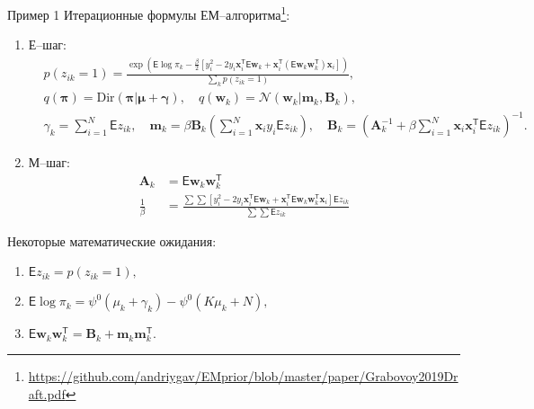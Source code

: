 \documentclass[9pt,pdf,hyperref={unicode}]{beamer}
\begin{document}
\begin{frame}{Пример 1}
\justifying
Итерационные формулы ЕМ--алгоритма\footnote{\url{https://github.com/andriygav/EMprior/blob/master/paper/Grabovoy2019Draft.pdf}}:
	\begin{enumerate}
		\item Е--шаг: 
			\begin{equation}
			\label{sl:4:eq:1}
				\begin{aligned}
					&p(z_{ik} = 1) = \frac{\exp\left(\mathsf{E}\log\pi_k - \frac{\beta}{2}\left[y_i^2 -2y_i\textbf{x}_i^{\mathsf{T}}\mathsf{E}\textbf{w}_k +\textbf{x}_i^{\mathsf{T}}\left(\mathsf{E}\textbf{w}_k\textbf{w}_k^{\mathsf{T}}\right)\textbf{x}_i\right] \right)}{\sum_k p(z_{ik}=1)},\\
					&q(\bm{\pi}) = \text{Dir}(\bm{\pi}|\bm{\mu}+ \bm{\gamma}), \quad
					q(\textbf{w}_k) = \mathcal{N}(\textbf{w}_k|\textbf{m}_k, \textbf{B}_k),\\
					&\gamma_k=\sum_{i=1}^{N}\mathsf{E}z_{ik}, \quad 
					\textbf{m}_k = \beta\textbf{B}_k\left(\sum_{i=1}^{N}\textbf{x}_iy_i\mathsf{E}z_{ik} \right), \quad
					\textbf{B}_k = \left(\textbf{A}_k^{-1} + \beta\sum_{i=1}^{N}\textbf{x}_i\textbf{x}_i^{\mathsf{T}}\mathsf{E}z_{ik}\right)^{-1}.
				\end{aligned}
			\end{equation}
		\item М--шаг: 
			\begin{equation}
			\label{sl:4:eq:2}
				\begin{aligned}
					\textbf{A}_k &= \mathsf{E}\textbf{w}_k\textbf{w}_k^{\mathsf{T}}\\
					 \frac{1}{\beta} &= \frac{\sum\sum\left[y_i^2 -2y_i\textbf{x}_i^{\mathsf{T}}\mathsf{E}\textbf{w}_k+\textbf{x}_i^{\mathsf{T}}\mathsf{E}\textbf{w}_k\textbf{w}_k^{\mathsf{T}}\textbf{x}_i\right]\mathsf{E}z_{ik}}{\sum\sum \mathsf{E}z_{ik}}
				\end{aligned}
			\end{equation}
	\end{enumerate}
Некоторые математические ожидания:
	\begin{enumerate}
		\item $\mathsf{E}z_{ik} = p(z_{ik} = 1),$
		\item $\mathsf{E}\log\pi_{k} = \psi^{0}(\mu_k + \gamma_k) - \psi^{0}(K\mu_k + N),$
		\item $\mathsf{E}\textbf{w}_k\textbf{w}_k^{\mathsf{T}} = \textbf{B}_k + \textbf{m}_k\textbf{m}_k^{\mathsf{T}}.$
	\end{enumerate}
\end{frame}
\end{document}
